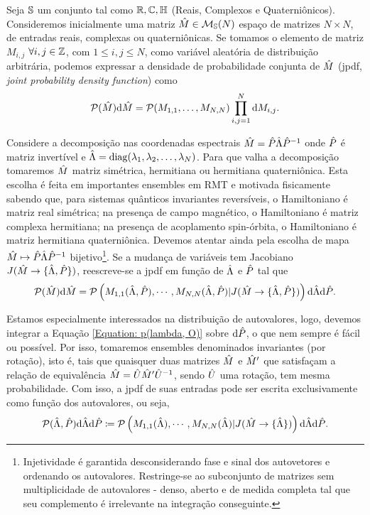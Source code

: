 \documentclass[12pt]{report}
\begin{document}
Seja $\mathbb{S}$ um conjunto tal como $\mathbb{R}, \mathbb{C}, \mathbb{H} $ (Reais, Complexos e Quaterniônicos). Consideremos inicialmente uma matriz $\hat M \in \mathcal{M}_{\mathbb{S}}(N)$ espaço de matrizes $N \times N$, de entradas reais, complexas ou quaterniônicas. Se tomamos o elemento de matriz $M_{i,j}$ $\forall i, j \in \mathbb{Z}$, com $1 \leq i, j \leq N$, como variável aleatória de distribuição arbitrária, podemos expressar a densidade de probabilidade conjunta de $\hat M$ (jpdf, \textit{joint probability density function}) como $$\mathcal{P}(\hat{M}) \mathrm{d} \hat M = \mathcal{P}(M_{1,1}, \dots, M_{N,N}) \prod_{i,j=1}^{N} \mathrm{d} M_{i,j}.$$

Considere a decomposição nas coordenadas espectrais $\hat M = \hat P \hat\Lambda \hat P^{-1}$ onde $\hat P$ é matriz invertível e $\hat\Lambda = \operatorname{diag}(\lambda_1, \lambda_2, \dots, \lambda_N)$. Para que valha a decomposição tomaremos $\hat M$ matriz simétrica, hermitiana ou hermitiana quaterniônica. Esta escolha é feita em importantes ensembles em RMT e motivada fisicamente sabendo que, para sistemas quânticos invariantes reversíveis, o Hamiltoniano é matriz real simétrica; na presença de campo magnético, o Hamiltoniano é matriz complexa hermitiana; na presença de acoplamento spin-órbita, o Hamiltoniano é matriz hermitiana quaterniônica. \cite[Capítulo~2]{RMT-firstcourse-Potters} Devemos atentar ainda pela escolha de mapa $\hat M \mapsto \hat P \hat\Lambda \hat P^{-1}$ bijetivo\footnote{Injetividade é garantida desconsiderando fase e sinal dos autovetores e ordenando os autovalores. Restringe-se ao subconjunto de matrizes sem multiplicidade de autovalores - denso, aberto e de medida completa tal que seu complemento é irrelevante na integração conseguinte.}. Se a mudança de variáveis tem Jacobiano $J(\hat M \rightarrow \{ \hat\Lambda, \hat P \} )$, reescreve-se a jpdf em função de $\hat\Lambda$ e $\hat P$ tal que
\begin{equation}
	\mathcal{P}(\hat{M}) \mathrm{d} \hat M = \mathcal{P} \left( M_{1,1}(\hat\Lambda, \hat P), \cdots, M_{N,N}(\hat\Lambda, \hat P) | J(\hat M \rightarrow \{ \hat\Lambda, \hat P \} ) \right) \mathrm{d} \hat\Lambda \mathrm{d} \hat P.
	\label{Equation: p(lambda, O)}
\end{equation}

Estamos especialmente interessados na distribuição de autovalores, logo, devemos integrar a Equação \eqref{Equation: p(lambda, O)} sobre $\mathrm{d} \hat P$, o que nem sempre é fácil ou possível. Por isso, tomaremos ensembles denominados invariantes (por rotação), isto é, tais que quaisquer duas matrizes $\hat M$ e $\hat M'$ que satisfaçam a relação de equivalência $\hat M = \hat U \hat M' \hat U^{-1}$, sendo $\hat U$ uma rotação, tem mesma probabilidade. Com isso, a jpdf de suas entradas pode ser escrita exclusivamente como função dos autovalores, ou seja, $$\mathcal{P}(\hat\Lambda, \hat P) \mathrm{d} \hat\Lambda \mathrm{d} \hat P \coloneqq \mathcal{P} \left( M_{1,1}( \hat\Lambda), \cdots, M_{N,N}(\hat\Lambda) | J(\hat M \rightarrow \{\hat\Lambda\} ) \right) \mathrm{d} \hat\Lambda \mathrm{d} \hat P.$$
\end{document}
